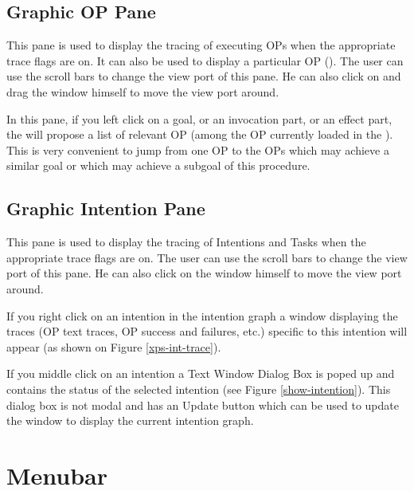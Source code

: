 \subsection{Graphic OP Pane}

This pane is used to display the tracing of executing OPs when the
appropriate trace flags are on. It can also be used to display a particular
OP (). The user can use the scroll bars to change the
view port of this pane. He can also click on and drag the window himself to
move the view port around.

In this pane, if you left click on a goal, or an invocation part, or an effect
part, the \XPK{} will propose a list of relevant OP (among the OP currently
loaded in the \XPK{}). This is very convenient to jump from one OP to the OPs
which may achieve a similar goal or which may achieve a subgoal of this procedure.

\subsection{Graphic Intention Pane}

This pane is used to display the tracing of Intentions and Tasks when the
appropriate trace flags are on. The user can use the scroll bars to change
the view port of this pane. He can also click on the window himself to move
the view port around.


If you right click on an intention in the intention graph a window displaying
the traces (OP text traces, OP success and failures, etc.) specific to this
intention will appear (as shown on Figure \ref{xps-int-trace}).


If you middle click on an intention a Text Window Dialog Box is poped up and
contains the status of the selected intention (see Figure
\ref{show-intention}). This dialog box is not modal and has an Update button
which can be used to update the window to display the current intention graph.

\section{Menubar}

